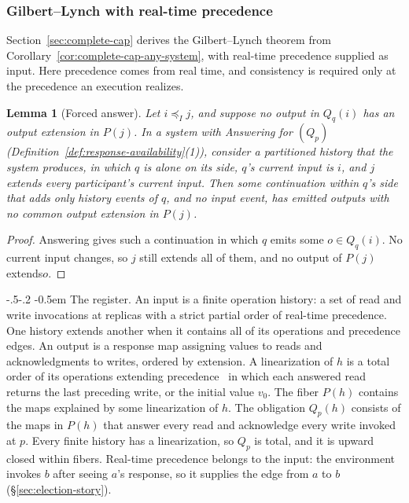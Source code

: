 \documentclass[sigconf]{cidr-2027}
\makeatletter
\newtheorem{lemma}{Lemma}
\theoremstyle{remark}
\renewcommand\paragraph{\@startsection{paragraph}{4}{\z@}%
  {-.5\baselineskip \@plus -2\p@ \@minus -.2\p@}%
  {-0.5em}%
  {\normalfont\bfseries}}
\newcommand{\InputOrd}{\preceq_I}
\newcommand{\inrel}{extends\xspace}          %
\newcommand{\outrel}{extends\xspace}          %
\newcommand{\outnoun}{output extension\xspace}%
\newcommand{\fiber}[1]{P(#1)}
\makeatother
\begin{document}
\subsubsection{Gilbert--Lynch with real-time precedence}

Section~\ref{sec:complete-cap} derives the Gilbert--Lynch theorem from
Corollary~\ref{cor:complete-cap-any-system}, with real-time precedence supplied
as input. Here precedence comes from real time, and consistency is required
only at the precedence an execution realizes.

\begin{lemma}[Forced answer]
\label{lem:forced-answer}
Let $i\InputOrd j$, and suppose no output in $Q_q(i)$ has an \outnoun in
$\fiber{j}$. In a system with Answering for $(Q_p)$
(Definition~\ref{def:response-availability}(1)), consider a partitioned
history that the system produces, in which $q$ is alone on its side,
$q$'s current input is $i$, and $j$ \inrel every participant's current input. Then some continuation within $q$'s side that adds only history events of $q$,
and no input event, has emitted outputs with no common \outnoun in
$\fiber{j}$.
\end{lemma}

\begin{proof}
Answering gives such a continuation in which $q$ emits some $o\in Q_q(i)$. No
current input changes, so $j$ still \inrel all of them, and no output of
$\fiber{j}$ \outrel $o$.
\end{proof}

\paragraph{The register.}
An input is a finite operation history: a set of read and write invocations at
replicas with a strict partial order of real-time precedence. One history
\inrel another when it contains all of its operations and precedence edges. An output is a response map assigning values to reads and acknowledgments to
writes, ordered by extension. A linearization of $h$ is a total order of its
operations extending precedence~\cite{herlihy1990linearizability} in which
each answered read returns the last preceding write, or the initial value
$v_0$. The fiber $\fiber{h}$ contains the maps explained by some
linearization of $h$. The obligation $Q_p(h)$ consists of the maps in
$\fiber{h}$ that answer every read and acknowledge every write invoked at $p$. Every finite history has a linearization, so $Q_p$ is total, and it is upward
closed within fibers. Real-time precedence belongs to the input: the
environment invokes $b$ after seeing $a$'s response, so it supplies the edge
from $a$ to $b$ (\S\ref{sec:election-story}).
\end{document}
